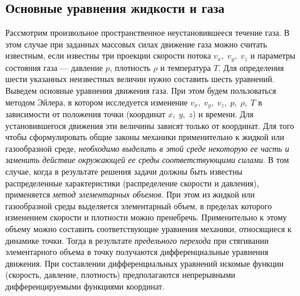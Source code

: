 	\subsection{Основные уравнения жидкости и газа}
	Рассмотрим произвольное пространственное неустановившееся течение газа. В этом случае при заданных массовых силах движение газа можно считать известным, если известны три проекции скорости потока $v_x,\; v_y,\; v_z$ и параметры состояния газа --- давление $p$, плотность $\rho$ и температура $T$.\n
	Для определения шести указанных неизвестных величин нужно составить шесть уравнений. Выведем основные уравнения движения газа. При этом будем пользоваться методом Эйлера, в котором исследуется изменение $v_x,\; v_y,\; v_z,\; p,\; \rho,\; T$ в зависимости от положения точки (координат $x,\; y,\; z$) и времени. Для установившегося движения эти величины зависят только от координат.\n
	Для того чтобы сформулировать общие законы механики применительно к жидкой или газообразной среде, \textit{необходимо выделить в этой среде некоторую ее часть и заменить действие окружающей ее среды соответствующими силами}. В том случае, когда в результате решения задачи должны быть известны распределенные характеристики (распределение скорости и давления), применяется \textit{метод элементарных объемов}. При этом из жидкой или газообразной среды выделяется элементарный объем, в пределах которого изменением скорости и плотности можно пренебречь. Применительно к этому объему можно составить соответствующие уравнения механики, относящиеся к динамике точки. Тогда в результате \textit{предельного перехода} при стягивании элементарного объема в точку получаются дифференциальные уравнения движения.\n
	При составлении дифференциальных уравнений искомые функции (скорость, давление, плотность) предполагаются непрерывными дифференцируемыми функциями координат.
	
